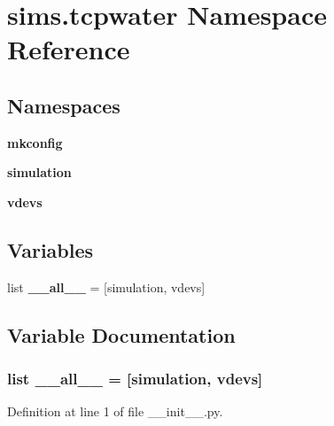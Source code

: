 \section{sims.\+tcpwater Namespace Reference}
\label{namespacesims_1_1tcpwater}
\subsection*{Namespaces}
\begin{DoxyCompactItemize}
\item 
 {\bf mkconfig}
\item 
 {\bf simulation}
\item 
 {\bf vdevs}
\end{DoxyCompactItemize}
\subsection*{Variables}
\begin{DoxyCompactItemize}
\item 
list {\bf \+\_\+\+\_\+all\+\_\+\+\_\+} = [\textquotesingle{}simulation\textquotesingle{}, \textquotesingle{}vdevs\textquotesingle{}]
\end{DoxyCompactItemize}


\subsection{Variable Documentation}
\subsubsection[{\+\_\+\+\_\+all\+\_\+\+\_\+}]{\setlength{\rightskip}{0pt plus 5cm}list \+\_\+\+\_\+all\+\_\+\+\_\+ = [\textquotesingle{}simulation\textquotesingle{}, \textquotesingle{}vdevs\textquotesingle{}]}\label{namespacesims_1_1tcpwater_aa4a022e6ddacd362b83964da5cc5d044}


Definition at line 1 of file \+\_\+\+\_\+init\+\_\+\+\_\+.\+py.


